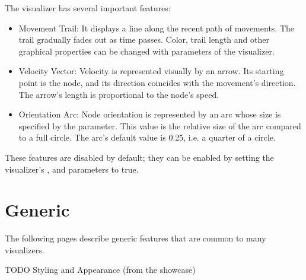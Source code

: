 The visualizer has several important features:

\begin{itemize}
  \item Movement Trail: It displays a line along the recent path of movements.
        The trail gradually fades out as time passes. Color, trail length and
        other graphical properties can be changed with parameters of the
        visualizer.
  \item Velocity Vector: Velocity is represented visually by an arrow. Its
        starting point is the node, and its direction coincides with the
        movement's direction. The arrow's length is proportional to the node's
       speed.
  \item Orientation Arc: Node orientation is represented by an arc whose size
       is specified by the  parameter. This value is the
       relative size of the arc compared to a full circle. The arc's default
       value is 0.25, i.e. a quarter of a circle.
\end{itemize}

These features are disabled by default; they can be enabled by setting the
visualizer's ,  and
 parameters to true.


\section{Generic}
\label{sec:visualization:generic}

The following pages describe generic features that are common to many visualizers.

TODO Styling and Appearance (from the showcase)



